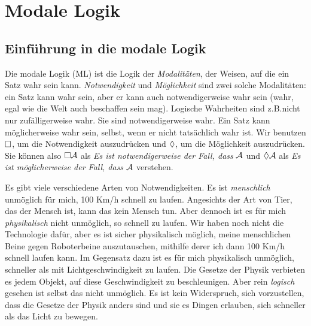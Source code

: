 
\part{Modale Logik}
\label{ch.ML}

%

\chapter{Einführung in die modale Logik}
\label{Intro}

Die modale Logik (ML) ist die Logik der \emph{Modalitäten}, der Weisen, auf die ein Satz wahr sein kann. \emph{Notwendigkeit} und \emph{Möglichkeit} sind zwei solche Modalitäten: ein Satz kann wahr sein, aber er kann auch notwendigerweise wahr sein (wahr, egal wie die Welt auch beschaffen sein mag). Logische Wahrheiten sind z.B.\@ nicht nur zufälligerweise wahr. Sie sind notwendigerweise wahr. Ein Satz kann möglicherweise wahr sein, selbst, wenn er nicht tatsächlich wahr ist. Wir benutzen $\Box$, um die Notwendigkeit auszudrücken und $\Diamond$, um die Möglichkeit auszudrücken. Sie können also $\Box \mathcal{A}$ als \emph{Es ist notwendigerweise der Fall, dass} $\mathcal{A}$ und $\Diamond \mathcal{A}$ als \emph{Es ist möglicherweise der Fall, dass} $\mathcal{A}$ verstehen.

Es gibt viele verschiedene Arten von Notwendigkeiten. Es ist \emph{menschlich} unmöglich für mich, 100 Km/h schnell zu laufen. Angesichts der Art von Tier, das der Mensch ist, kann das kein Mensch tun. Aber dennoch ist es für mich \emph{physikalisch} nicht unmöglich, so schnell zu laufen. Wir haben noch nicht die Technologie dafür, aber es ist sicher physikalisch möglich, meine menschlichen Beine gegen Roboterbeine auszutauschen, mithilfe derer ich dann 100 Km/h schnell laufen kann. Im Gegensatz dazu ist es für mich physikalisch unmöglich, schneller als mit Lichtgeschwindigkeit zu laufen. Die Gesetze der Physik verbieten es jedem Objekt, auf diese Geschwindigkeit zu beschleunigen. Aber rein \emph{logisch} gesehen ist selbst das nicht unmöglich. Es ist kein Widerspruch, sich vorzustellen, dass die Gesetze der Physik anders sind und sie es Dingen erlauben, sich schneller als das Licht zu bewegen.

